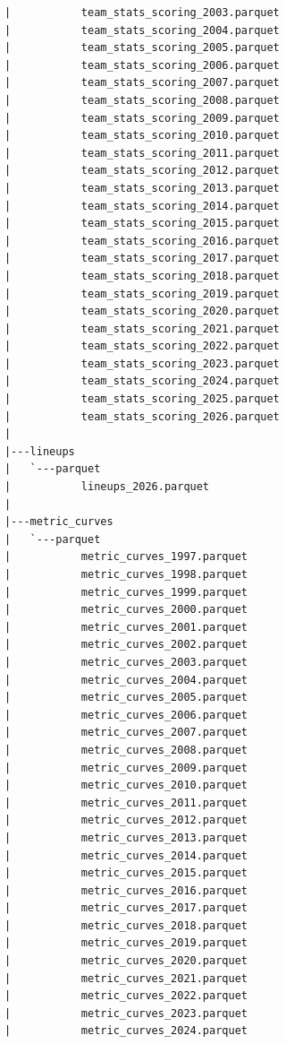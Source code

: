 \begin{lstlisting}
      |           team_stats_scoring_2003.parquet
      |           team_stats_scoring_2004.parquet
      |           team_stats_scoring_2005.parquet
      |           team_stats_scoring_2006.parquet
      |           team_stats_scoring_2007.parquet
      |           team_stats_scoring_2008.parquet
      |           team_stats_scoring_2009.parquet
      |           team_stats_scoring_2010.parquet
      |           team_stats_scoring_2011.parquet
      |           team_stats_scoring_2012.parquet
      |           team_stats_scoring_2013.parquet
      |           team_stats_scoring_2014.parquet
      |           team_stats_scoring_2015.parquet
      |           team_stats_scoring_2016.parquet
      |           team_stats_scoring_2017.parquet
      |           team_stats_scoring_2018.parquet
      |           team_stats_scoring_2019.parquet
      |           team_stats_scoring_2020.parquet
      |           team_stats_scoring_2021.parquet
      |           team_stats_scoring_2022.parquet
      |           team_stats_scoring_2023.parquet
      |           team_stats_scoring_2024.parquet
      |           team_stats_scoring_2025.parquet
      |           team_stats_scoring_2026.parquet
      |
      |---lineups
      |   `---parquet
      |           lineups_2026.parquet
      |
      |---metric_curves
      |   `---parquet
      |           metric_curves_1997.parquet
      |           metric_curves_1998.parquet
      |           metric_curves_1999.parquet
      |           metric_curves_2000.parquet
      |           metric_curves_2001.parquet
      |           metric_curves_2002.parquet
      |           metric_curves_2003.parquet
      |           metric_curves_2004.parquet
      |           metric_curves_2005.parquet
      |           metric_curves_2006.parquet
      |           metric_curves_2007.parquet
      |           metric_curves_2008.parquet
      |           metric_curves_2009.parquet
      |           metric_curves_2010.parquet
      |           metric_curves_2011.parquet
      |           metric_curves_2012.parquet
      |           metric_curves_2013.parquet
      |           metric_curves_2014.parquet
      |           metric_curves_2015.parquet
      |           metric_curves_2016.parquet
      |           metric_curves_2017.parquet
      |           metric_curves_2018.parquet
      |           metric_curves_2019.parquet
      |           metric_curves_2020.parquet
      |           metric_curves_2021.parquet
      |           metric_curves_2022.parquet
      |           metric_curves_2023.parquet
      |           metric_curves_2024.parquet

\end{lstlisting}
